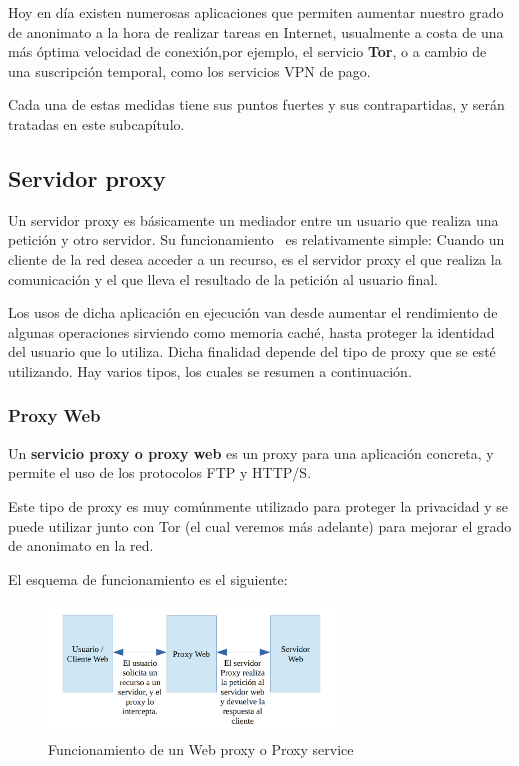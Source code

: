 Hoy en día existen numerosas aplicaciones que permiten aumentar nuestro grado de anonimato a la hora de realizar tareas en Internet, usualmente a costa de una más óptima velocidad de conexión,por ejemplo, el servicio \textbf{Tor}, o a cambio de una suscripción temporal, como los servicios VPN de pago.

Cada una de estas medidas tiene sus puntos fuertes y sus contrapartidas, y serán tratadas en este subcapítulo.

\subsection{Servidor proxy}

Un servidor proxy es básicamente un mediador entre un usuario que realiza una petición y otro servidor.
Su funcionamiento~\cite{article:proxy} es relativamente simple: Cuando un cliente de la red desea acceder a un recurso, es el servidor proxy el que realiza la comunicación y el que lleva el resultado de la petición al usuario final. 

Los usos de dicha aplicación en ejecución van desde aumentar el rendimiento de algunas operaciones sirviendo como memoria caché, hasta proteger la identidad del usuario que lo utiliza.
Dicha finalidad depende del tipo de proxy que se esté utilizando.
Hay varios tipos, los cuales se resumen a continuación.

\subsubsection{Proxy Web}

Un \textbf{servicio proxy o proxy web} es un proxy para una aplicación concreta, y permite el uso de los protocolos FTP y HTTP/S.

Este tipo de proxy es muy comúnmente utilizado para proteger la privacidad y se puede utilizar junto con Tor (el cual veremos más adelante) para mejorar el grado de anonimato en la red.

El esquema de funcionamiento es el siguiente:

\begin{figure}[h]
	\centerline{
		\mbox{\includegraphics[width=3.00in]{images/proxy_web.png}}
	}
	\caption{Funcionamiento de un Web proxy o Proxy service}
	\label{fig:web_proxy}
\end{figure}

